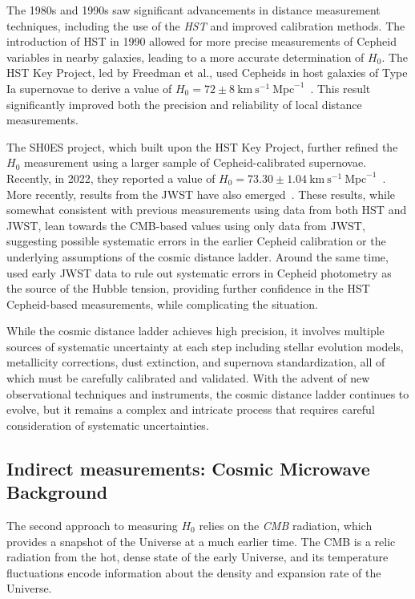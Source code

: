 The 1980s and 1990s saw significant advancements in distance measurement techniques, including the use of the \textit{\ac{HST}} and improved calibration methods. The introduction of \ac{HST} in 1990 allowed for more precise measurements of Cepheid variables in nearby galaxies, leading to a more accurate determination of $H_0$. The \ac{HST} Key Project, led by Freedman et al., used Cepheids in host galaxies of Type Ia supernovae to derive a value of $H_0 = 72 \pm 8~\mathrm{km}~\mathrm{s}^{-1}~\mathrm{Mpc}^{-1}$~\citep{freedman2001final}. This result significantly improved both the precision and reliability of local distance measurements.

The \ac{SH0ES} project, which built upon the \ac{HST} Key Project, further refined the $H_0$ measurement using a larger sample of Cepheid-calibrated supernovae. Recently, in 2022, they reported a value of $H_0 = 73.30 \pm 1.04~\mathrm{km}~\mathrm{s}^{-1}~\mathrm{Mpc}^{-1}$~\citep{riess2022comprehensive}. More recently, results from the \ac{JWST} have also emerged~\citep{freedman2024status}. These results, while somewhat consistent with previous measurements using data from both \ac{HST} and \ac{JWST}, lean towards the \acs{CMB}-based values using only data from \ac{JWST}, suggesting possible systematic errors in the earlier Cepheid calibration or the underlying assumptions of the cosmic distance ladder. Around the same time, \citet{riess2024jwst} used early \ac{JWST} data to rule out systematic errors in Cepheid photometry as the source of the Hubble tension, providing further confidence in the \ac{HST} Cepheid-based measurements, while complicating the situation.

While the cosmic distance ladder achieves high precision, it involves multiple sources of systematic uncertainty at each step including stellar evolution models, metallicity corrections, dust extinction, and supernova standardization, all of which must be carefully calibrated and validated. With the advent of new observational techniques and instruments, the cosmic distance ladder continues to evolve, but it remains a complex and intricate process that requires careful consideration of systematic uncertainties.

\subsection{Indirect measurements: Cosmic Microwave Background}
The second approach to measuring $H_0$ relies on the \textit{\acf{CMB}} radiation, which provides a snapshot of the Universe at a much earlier time. The \ac{CMB} is a relic radiation from the hot, dense state of the early Universe, and its temperature fluctuations encode information about the density and expansion rate of the Universe.


